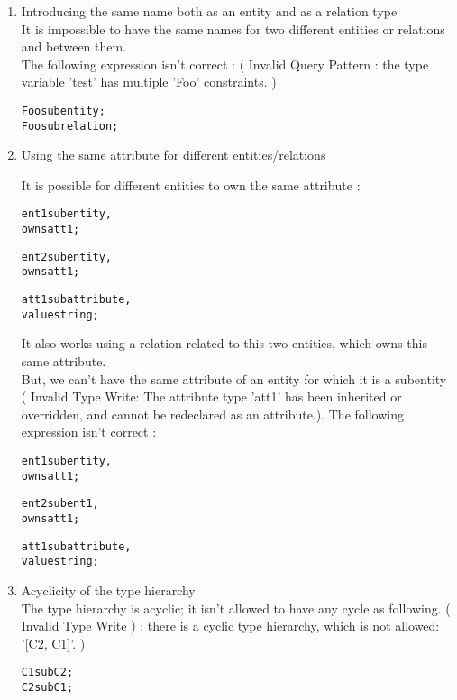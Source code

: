 \documentclass[runningheads]{llncs}
\begin{document}
\begin{enumerate}

\item Introducing the same name both as an entity and as a relation type \\
It is impossible to have the same names for two different entities or relations and between them. \\ 
The following expression isn't correct :  ( Invalid Query Pattern : the type variable 'test' has multiple 'Foo' constraints. )

  \begin{alltt}
    Foo sub entity;
    Foo sub relation;
  \end{alltt}


\item Using the same attribute for different entities/relations \

It is possible for different entities to own the same attribute :

  \begin{alltt}
     ent1 sub entity,
       owns att1;
     	
     ent2 sub entity,
       owns att1;
    		
    	 att1 sub attribute,
       value string;
  \end{alltt}
  
It also works using a relation related to this two entities, which owns this same attribute. \\
But, we can't have the same attribute of an entity for which it is a subentity ( Invalid Type Write: The attribute type 'att1' has been inherited or overridden, and cannot be redeclared as an attribute.). The following expression isn't correct :

\begin{alltt}
     ent1 sub entity,
       owns att1;
     	
     ent2 sub ent1,
       owns att1;
    		
    	 att1 sub attribute,
       value string;
  \end{alltt}
	
\item Acyclicity of the type hierarchy \\
The type hierarchy is acyclic; it isn't allowed to have any cycle as following. ( Invalid Type Write ) : there is a cyclic type hierarchy, which is not allowed: '[C2, C1]'. )

  \begin{alltt}
    C1 sub C2;
    C2 sub C1;
  \end{alltt}



\end{enumerate}
\end{document}
